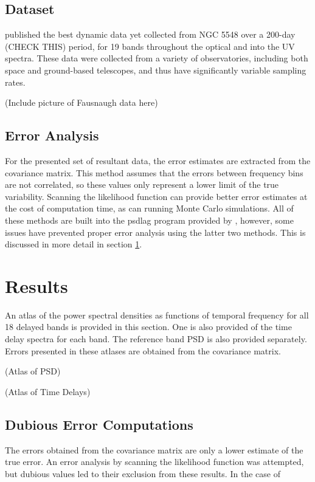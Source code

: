 \documentclass[11pt,letterpaper,fleqn]{article}
\begin{document}
	\subsection{Dataset}
	\citet{2016ApJ...821...56F} published the best dynamic data yet collected
	from NGC 5548 over a 200-day (CHECK THIS) period, for 19 bands throughout
	the optical and into the UV spectra. These data were collected from a
	variety of observatories, including both space and ground-based
	telescopes, and thus have significantly variable sampling rates.

	(Include picture of Fausnaugh data here)

	\subsection{Error Analysis}
	For the presented set of resultant data, the error estimates are extracted
	from the covariance matrix. This method assumes that the errors between
	frequency bins are not correlated, so these values only represent a lower
	limit of the true variability. Scanning the likelihood function can
	provide better error estimates at the cost of computation time, as can
	running Monte Carlo simulations. All of these methods are built into the
	psdlag program provided by \citet{2013ApJ...777...24Z}, however, some
	issues have prevented proper error analysis using the latter two methods.
	This is discussed in more detail in section \ref{results}.


\section{Results}
\label{results}

	An atlas of the power spectral densities as functions
	of temporal	frequency for all 18 delayed bands is provided in this section.
	One is also provided of the time delay spectra for each band. The reference
	band PSD is also provided separately. Errors presented in these atlases
	are obtained from the covariance matrix.

	(Atlas of PSD)

	(Atlas of Time Delays)

	\subsection{Dubious Error Computations}
	The errors obtained from the covariance matrix are only a lower estimate
	of the true error. An error analysis by scanning the likelihood function
	was attempted, but dubious values led to their exclusion from these results.
	In the case of
\end{document}

